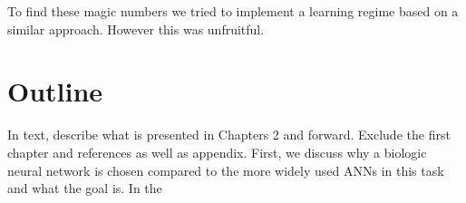 To find these magic numbers we tried to implement a learning regime based on a similar approach. However this was unfruitful.


\section{Outline}
In text, describe what is presented in Chapters 2 and forward. Exclude the first chapter and references as well as appendix.
First, we discuss why a biologic neural network is chosen compared to the more widely used \acp{ANN} in this task and what the goal is. In the